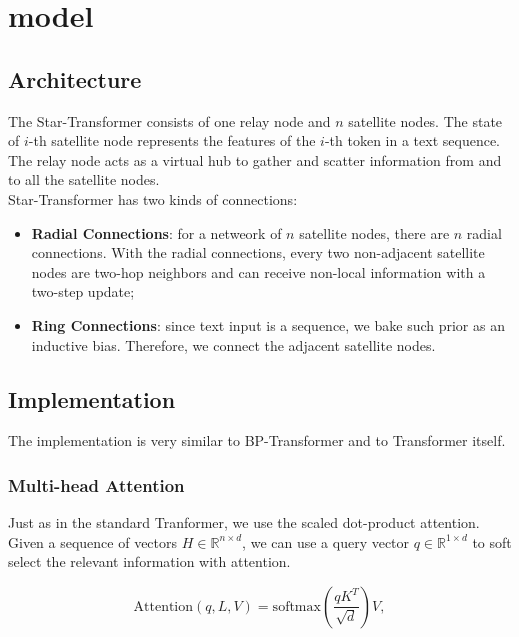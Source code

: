 \section{model}

\subsection{Architecture}

The Star-Transformer consists of one relay node and $n$ satellite nodes. The
state of $i$-th satellite node represents the features of the $i$-th token in a
text sequence. The relay node acts as a virtual hub to gather and scatter
information from and to all the satellite nodes.\\
Star-Transformer has two kinds of connections:
\begin{itemize}
    \item \textbf{Radial Connections}: for a netweork of $n$ satellite nodes,
    there are $n$ radial connections. With the radial connections, every two
    non-adjacent satellite nodes are two-hop neighbors and can receive non-local
    information with a two-step update;

    \item \textbf{Ring Connections}: since text input is a sequence, we bake
    such prior as an inductive bias. Therefore, we connect the adjacent
    satellite nodes.
\end{itemize}

\subsection{Implementation}

The implementation is very similar to BP-Transformer and to Transformer itself.

\subsubsection{Multi-head Attention}
Just as in the standard Tranformer, we use the scaled dot-product attention.
Given a sequence of vectors $H \in \mathbb{R}^{n \times d}$, we can use a query
vector $q \in \mathbb{R}^{1 \times d}$ to soft select the relevant information
with attention.

\begin{equation}
    \text{Attention}(q, L, V) =
    \text{softmax}\left(\frac{qK^T}{\sqrt{d}}\right)V,
\end{equation}

